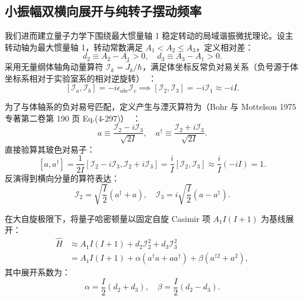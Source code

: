 \subsection{小振幅双横向展开与纯转子摆动频率}\label{sec:3-2-3}

我们进而建立量子力学下围绕最大惯量轴 1 稳定转动的局域谐振微扰理论。设主转动轴为最大惯量轴 1，转动常数满足 $A_1 < A_2 \le A_3$，定义相对差：
\begin{equation}\label{eq:3-2-d-params}
d_2 \equiv A_2 - A_1 > 0, \quad d_3 \equiv A_3 - A_1 > 0.
\end{equation}
采用无量纲体轴角动量算符 $\mathcal{I}_k = \hat{J}_k / \hbar$，满足体坐标反常负对易关系（负号源于体坐标系相对于实验室系的相对逆旋转）~\cite{book-bohr-mottelson-nuclear-structure-vol2}：
\begin{equation}\label{eq:3-2-body-fixed-commutation}
[\mathcal{I}_a, \mathcal{I}_b] = -i \epsilon_{abc} \mathcal{I}_c \implies [\mathcal{I}_2, \mathcal{I}_3] = -i \mathcal{I}_1 \approx -i I.
\end{equation}

为了与体轴系的负对易号匹配，定义产生与湮灭算符为（Bohr 与 Mottelson 1975 专著第二卷第 190 页 Eq.(4-297)）~\cite{book-bohr-mottelson-nuclear-structure-vol2}：
\begin{equation}\label{eq:3-2-boson-mapping}
a \equiv \frac{\mathcal{I}_2 - i \mathcal{I}_3}{\sqrt{2I}}, \quad a^\dagger \equiv \frac{\mathcal{I}_2 + i \mathcal{I}_3}{\sqrt{2I}}.
\end{equation}
直接验算其玻色对易子：
\begin{equation}\label{eq:3-2-boson-commutator}
[a, a^\dagger] = \frac{1}{2I} [\mathcal{I}_2 - i \mathcal{I}_3, \mathcal{I}_2 + i \mathcal{I}_3] = \frac{i}{I} [\mathcal{I}_2, \mathcal{I}_3] \approx \frac{i}{I} (-i I) = 1.
\end{equation}
反演得到横向分量的算符表达：
\begin{equation}\label{eq:3-2-transverse-coords}
\mathcal{I}_2 = \sqrt{\frac{I}{2}} (a^\dagger + a), \quad \mathcal{I}_3 = i \sqrt{\frac{I}{2}} (a - a^\dagger).
\end{equation}

在大自旋极限下，将量子哈密顿量以固定自旋 Casimir 项 $A_1 I(I+1)$ 为基线展开：
\begin{align}
\hat{H} &\approx A_1 I(I+1) + d_2 \mathcal{I}_2^2 + d_3 \mathcal{I}_3^2 \nonumber \\
&= A_1 I(I+1) + \alpha (a^\dagger a + a a^\dagger) + \beta (a^{\dagger 2} + a^2), \label{eq:3-2-boson-H}
\end{align}
其中展开系数为：
\begin{equation}\label{eq:3-2-alpha-beta}
\alpha = \frac{I}{2} (d_2 + d_3), \quad \beta = \frac{I}{2} (d_2 - d_3).
\end{equation}

